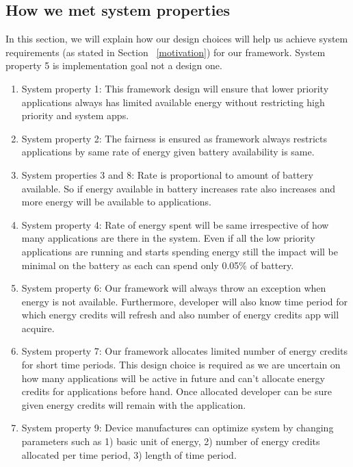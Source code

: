 \subsection{How we met system properties}


In this section, we will explain how our design choices will help us achieve system requirements (as stated in Section ~\ref{motivation}) for our framework. System property 5 is implementation goal not a design one.

\begin{enumerate}

\item  System property 1: This framework design will ensure that lower priority applications always has limited available energy without restricting high priority and system apps.

\item  System property 2: The fairness is ensured as framework always restricts applications by same rate of energy given battery availability is same. 

\item  System properties 3 and 8: Rate is proportional to amount of battery available. So if energy available in battery increases rate also increases and more energy will be available to applications.

\item System property 4: Rate of energy spent will be same irrespective of how many applications are there in the system. Even if all the low priority applications are running and starts spending energy still the impact will be minimal on the battery as each can spend only 0.05\% of battery.

\item System property 6: Our framework will always throw an exception when energy is not available. Furthermore, developer will also know time period for which energy credits will refresh and also number of energy credits app will acquire.

\item System property 7: Our framework allocates limited number of energy credits for short time periods. This design choice is required as we are uncertain on how many applications will be active in future and can't allocate energy credits for applications before hand. Once allocated developer can be sure given energy credits will remain with the application.

\item System property 9: Device manufactures can optimize system by changing parameters such as 1) basic unit of energy, 2) number of energy credits allocated per time period, 3) length of time period. 

\end{enumerate}

